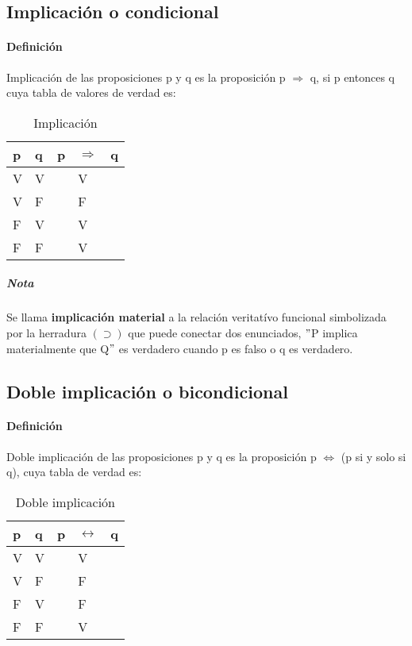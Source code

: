 \documentclass[10pt]{book} 						%
\begin{document}
\subsection{Implicación o condicional}
\paragraph{Definición}
Implicación de las proposiciones p y q es la proposición p $\Rightarrow$ q, si p entonces q cuya tabla de valores de verdad es:
\begin{table}[htbp]
  \centering
  \caption{Implicación}
    \begin{tabular}{l|l|rlr}
    p     & q     & \multicolumn{1}{l}{p} & $\Rightarrow$     & \multicolumn{1}{l}{q} \\
    \midrule
    V     & V     &       & V     &  \\
    V     & F     &       & F     &  \\
    F     & V     &       & V     &  \\
    F     & F     &       & V     &  \\
    \end{tabular}%
  \label{tab:addlabel}%
\end{table}%
\vspace{2cm}
\subparagraph{Nota}
Se llama \textbf{implicación material} a la relación veritatívo funcional simbolizada por la herradura $(\supset)$ que puede conectar dos enunciados, $"$P implica materialmente que Q$"$ es verdadero cuando p es falso o q es verdadero. 
\subsection{Doble implicación o bicondicional}
\paragraph{Definición}
Doble implicación de las proposiciones p y q es la proposición p $\Leftrightarrow$ (p si y solo si q), cuya tabla de verdad es:
\begin{table}[htbp]
  \centering
  \caption{Doble implicación}
    \begin{tabular}{l|l|rlr}
    p     & q     & \multicolumn{1}{l}{p} & $\leftrightarrow$     & \multicolumn{1}{l}{q} \\
    \midrule
    V     & V     &       & V     &  \\
    V     & F     &       & F     &  \\
    F     & V     &       & F     &  \\
    F     & F     &       & V     &  \\
    \end{tabular}%
  \label{tab:addlabel}%
\end{table}%
\end{document}
